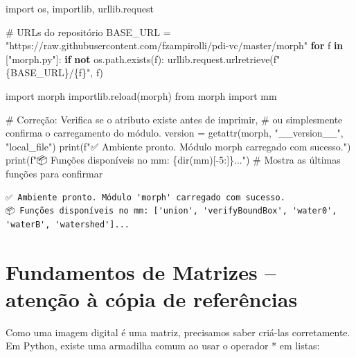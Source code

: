 \documentclass[
  portuguese,
  letterpaper,
  openany,
  oneside,
  12pt,
  a4paper]{book}
\newenvironment{Shaded}{\begin{snugshade}}{\end{snugshade}}
\newcommand{\BuiltInTok}[1]{\textcolor[rgb]{0.00,0.23,0.31}{#1}}
\newcommand{\CommentTok}[1]{\textcolor[rgb]{0.37,0.37,0.37}{#1}}
\newcommand{\ControlFlowTok}[1]{\textcolor[rgb]{0.00,0.23,0.31}{\textbf{#1}}}
\newcommand{\DecValTok}[1]{\textcolor[rgb]{0.68,0.00,0.00}{#1}}
\newcommand{\ImportTok}[1]{\textcolor[rgb]{0.00,0.46,0.62}{#1}}
\newcommand{\KeywordTok}[1]{\textcolor[rgb]{0.00,0.23,0.31}{\textbf{#1}}}
\newcommand{\NormalTok}[1]{\textcolor[rgb]{0.00,0.23,0.31}{#1}}
\newcommand{\OperatorTok}[1]{\textcolor[rgb]{0.37,0.37,0.37}{#1}}
\newcommand{\SpecialCharTok}[1]{\textcolor[rgb]{0.37,0.37,0.37}{#1}}
\newcommand{\SpecialStringTok}[1]{\textcolor[rgb]{0.13,0.47,0.30}{#1}}
\newcommand{\StringTok}[1]{\textcolor[rgb]{0.13,0.47,0.30}{#1}}
\begin{document}
\begin{Shaded}
\begin{Highlighting}[]
\ImportTok{import}\NormalTok{ os, importlib, urllib.request}

\CommentTok{\# URLs do repositório}
\NormalTok{BASE\_URL }\OperatorTok{=} \StringTok{"https://raw.githubusercontent.com/fzampirolli/pdi{-}vc/master/morph"}
\ControlFlowTok{for}\NormalTok{ f }\KeywordTok{in}\NormalTok{ [}\StringTok{"morph.py"}\NormalTok{]:}
    \ControlFlowTok{if} \KeywordTok{not}\NormalTok{ os.path.exists(f):}
\NormalTok{        urllib.request.urlretrieve(}\SpecialStringTok{f"}\SpecialCharTok{\{}\NormalTok{BASE\_URL}\SpecialCharTok{\}}\SpecialStringTok{/}\SpecialCharTok{\{}\NormalTok{f}\SpecialCharTok{\}}\SpecialStringTok{"}\NormalTok{, f)}

\ImportTok{import}\NormalTok{ morph}
\NormalTok{importlib.}\BuiltInTok{reload}\NormalTok{(morph)}
\ImportTok{from}\NormalTok{ morph }\ImportTok{import}\NormalTok{ mm}

\CommentTok{\# Correção: Verifica se o atributo existe antes de imprimir, }
\CommentTok{\# ou simplesmente confirma o carregamento do módulo.}
\NormalTok{version }\OperatorTok{=} \BuiltInTok{getattr}\NormalTok{(morph, }\StringTok{"\_\_version\_\_"}\NormalTok{, }\StringTok{"local\_file"}\NormalTok{)}
\BuiltInTok{print}\NormalTok{(}\SpecialStringTok{f"✅ Ambiente pronto. Módulo \textquotesingle{}morph\textquotesingle{} carregado com sucesso."}\NormalTok{)}
\BuiltInTok{print}\NormalTok{(}\SpecialStringTok{f"📦 Funções disponíveis no mm: }\SpecialCharTok{\{}\BuiltInTok{dir}\NormalTok{(mm)[}\OperatorTok{{-}}\DecValTok{5}\NormalTok{:]}\SpecialCharTok{\}}\SpecialStringTok{..."}\NormalTok{) }\CommentTok{\# Mostra as últimas funções para confirmar}
\end{Highlighting}
\end{Shaded}

\begin{verbatim}
✅ Ambiente pronto. Módulo 'morph' carregado com sucesso.
📦 Funções disponíveis no mm: ['union', 'verifyBoundBox', 'water0', 'waterB', 'watershed']...
\end{verbatim}

\section{Fundamentos de Matrizes -- atenção à cópia de
referências}\label{fundamentos-de-matrizes-atenuxe7uxe3o-uxe0-cuxf3pia-de-referuxeancias}

Como uma imagem digital é uma matriz, precisamos saber criá-las
corretamente. Em Python, existe uma armadilha comum ao usar o operador *
em listas:
\end{document}
